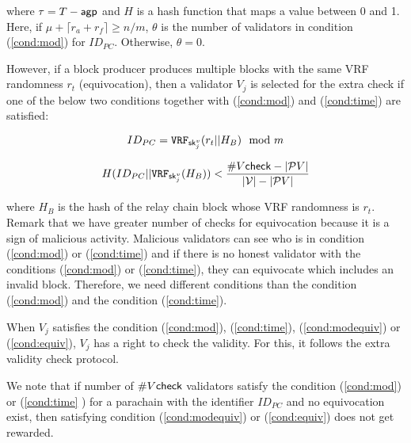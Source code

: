 \begin{enumerate}
      where $\tau = T- \mathsf{agp}$ and $H$ is a hash function that maps a value between 0 and 1. Here, if $\mu + \lceil r_a + r_f \rceil \geq n/m$, $\theta$ is the number of validators in condition (\ref{cond:mod}) for $ID_{PC}$. Otherwise, $\theta = 0$.
    
    However, if a block producer produces multiple blocks with the same VRF randomness $r_t$ (equivocation), then a validator $V_j$ is selected for the extra check if one of the  below two conditions together with (\ref{cond:mod}) and (\ref{cond:time}) are satisfied:
    
    
    \begin{equation}\label{cond:modequiv}
         ID_{PC} = \mathtt{VRF}_{\mathsf{sk}^v_{j}}(r_{t}||H_B) \mod m
    \end{equation}
    
    \begin{equation}\label{cond:equiv}
         H(ID_{PC} || \mathtt{VRF}_{\mathsf{sk}^v_j}(H_{B})) < \frac{\#V\mathsf{check} - |\mathcal{P}V|}{|\mathcal{V}|-|\mathcal{P}V|}   
    \end{equation}
    
     where $H_B$ is the hash of the relay chain block whose VRF randomness is $r_t$. Remark that we have greater number of checks for equivocation because it is a sign of malicious activity. Malicious validators can see who is in condition (\ref{cond:mod}) or (\ref{cond:time}) and if there is  no honest validator with the conditions (\ref{cond:mod}) or (\ref{cond:time}), they can equivocate which includes an invalid block. Therefore, we need different conditions than the condition (\ref{cond:mod}) and the condition (\ref{cond:time}).
    
    When $V_j$ satisfies the condition (\ref{cond:mod}), (\ref{cond:time}), (\ref{cond:modequiv}) or (\ref{cond:equiv}), $V_j$ has a right to check the validity. For this, it follows the extra validity check protocol.
    
    We note that if number of $\#V\mathsf{check}$ validators satisfy the condition (\ref{cond:mod}) or (\ref{cond:time} ) for a parachain with the identifier $ID_{PC}$ and no equivocation exist, then satisfying condition (\ref{cond:modequiv}) or (\ref{cond:equiv}) does not get rewarded.
    
\end{enumerate}



